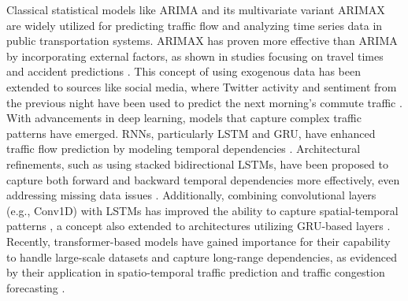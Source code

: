 \documentclass[acmsmall]{acmart}
\begin{document}
Classical statistical models like ARIMA \cite{kumar2022time, shahriari2020ensemble} and its multivariate variant ARIMAX \cite{su2020daily} are widely utilized for predicting traffic flow and analyzing time series data in public transportation systems. ARIMAX has proven more effective than ARIMA by incorporating external factors, as shown in studies focusing on travel times \cite{novak2023data} and accident predictions \cite{ihueze2018road}. {\color{black}This concept of using exogenous data has been extended to sources like social media, where Twitter activity and sentiment from the previous night have been used to predict the next morning's commute traffic \cite{yao2021twitter}.} With advancements in deep learning, models that capture complex traffic patterns have emerged. RNNs, particularly LSTM and GRU, have enhanced traffic flow prediction by modeling temporal dependencies \cite{ismaeel2023traffic, narmadha2023spatio, sroczynski2023road}. {\color{black}Architectural refinements, such as using stacked bidirectional LSTMs, have been proposed to capture both forward and backward temporal dependencies more effectively, even addressing missing data issues \cite{cui2020stacked}.} Additionally, combining convolutional layers (e.g., Conv1D) with LSTMs has improved the ability to capture spatial-temporal patterns \cite{long2021air}, {\color{black}a concept also extended to architectures utilizing GRU-based layers \cite{huang2025prediction}}. Recently, transformer-based models have gained importance for their capability to handle large-scale datasets and capture long-range dependencies, as evidenced by their application in spatio-temporal traffic prediction \cite{tian2023multi} and traffic congestion forecasting \cite{ramana2023vision}.







    
\end{document}
